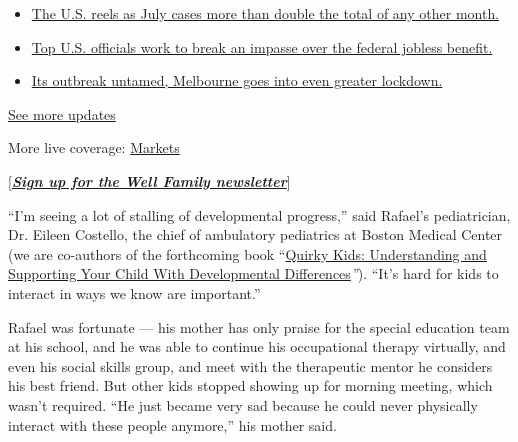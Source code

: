 \begin{itemize}
\tightlist
\item
  \href{https://www.nytimes.com/2020/08/01/world/coronavirus-covid-19.html?action=click\&pgtype=Article\&state=default\&region=MAIN_CONTENT_1\&context=storylines_live_updates\#link-34047410}{The
  U.S. reels as July cases more than double the total of any other
  month.}
\item
  \href{https://www.nytimes.com/2020/08/01/world/coronavirus-covid-19.html?action=click\&pgtype=Article\&state=default\&region=MAIN_CONTENT_1\&context=storylines_live_updates\#link-780ec966}{Top
  U.S. officials work to break an impasse over the federal jobless
  benefit.}
\item
  \href{https://www.nytimes.com/2020/08/01/world/coronavirus-covid-19.html?action=click\&pgtype=Article\&state=default\&region=MAIN_CONTENT_1\&context=storylines_live_updates\#link-2bc8948}{Its
  outbreak untamed, Melbourne goes into even greater lockdown.}
\end{itemize}

\href{https://www.nytimes.com/2020/08/01/world/coronavirus-covid-19.html?action=click\&pgtype=Article\&state=default\&region=MAIN_CONTENT_1\&context=storylines_live_updates}{See
more updates}

More live coverage:
\href{https://www.nytimes.com/live/2020/07/31/business/stock-market-today-coronavirus?action=click\&pgtype=Article\&state=default\&region=MAIN_CONTENT_1\&context=storylines_live_updates}{Markets}

{[}\textbf{\href{https://www.nytimes.com/newsletters/well-family}{\emph{Sign
up for the Well Family newsletter}}}{]}

``I'm seeing a lot of stalling of developmental progress,'' said
Rafael's pediatrician, Dr. Eileen Costello, the chief of ambulatory
pediatrics at Boston Medical Center (we are co-authors of the
forthcoming book
``\href{https://shop.aap.org/quirky-kids-2nd-edition-paperback/}{Quirky
Kids: Understanding and Supporting Your Child With Developmental
Differences}\emph{''}). ``It's hard for kids to interact in ways we know
are important.''

Rafael was fortunate --- his mother has only praise for the special
education team at his school, and he was able to continue his
occupational therapy virtually, and even his social skills group, and
meet with the therapeutic mentor he considers his best friend. But other
kids stopped showing up for morning meeting, which wasn't required. ``He
just became very sad because he could never physically interact with
these people anymore,'' his mother said.


